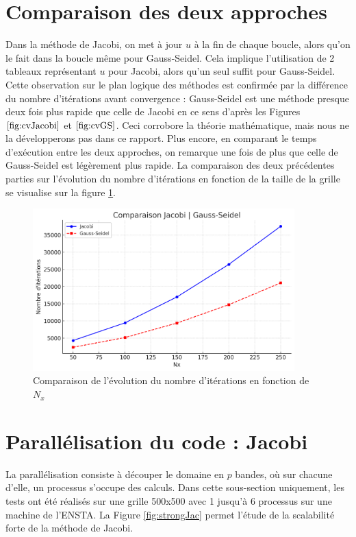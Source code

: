 \documentclass{article}
\begin{document}
\section{Comparaison des deux approches}
Dans la méthode de Jacobi, on met à jour $u$ à la fin de chaque boucle, alors qu'on le fait dans la boucle même pour Gauss-Seidel. Cela implique l'utilisation de 2 tableaux représentant $u$ pour Jacobi, alors qu'un seul suffit pour Gauss-Seidel. Cette observation sur le plan logique des méthodes est confirmée par la différence du nombre d'itérations avant convergence : Gauss-Seidel est une méthode presque deux fois plus rapide que celle de Jacobi en ce sens d'après les Figures $\ref{fig:cvJacobi}$ et $\ref{fig:cvGS}$. Ceci corrobore la théorie mathématique, mais nous ne la développerons pas dans ce rapport. Plus encore, en comparant le temps d'exécution entre les deux approches, on remarque une fois de plus que celle de Gauss-Seidel est légèrement plus rapide. La comparaison des deux précédentes parties sur l'évolution du nombre d'itérations en fonction de la taille de la grille se visualise sur la figure \ref{fig:comparaison}.

\begin{figure}[H]
    \centering
    \includegraphics[width=0.9\textwidth]{comparaison_j_gs.png}
    \caption{Comparaison de l'évolution du nombre d'itérations en fonction de $N_x$}
    \label{fig:comparaison}
\end{figure}


\section{Parallélisation du code : Jacobi}

La parallélisation consiste à découper le domaine en $p$ bandes, où sur chacune d'elle, un processus s'occupe des calculs. Dans cette sous-section uniquement, les tests ont été réalisés sur une grille 500x500 avec 1 jusqu'à 6 processus sur une machine de l'ENSTA. La Figure \ref{fig:strongJac} permet l'étude de la scalabilité forte de la méthode de Jacobi.
\end{document}
